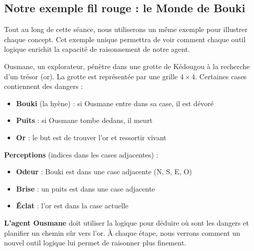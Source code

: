 \documentclass[11pt,a4paper]{article}
\begin{document}
\subsection{Notre exemple fil rouge : le Monde de Bouki}

Tout au long de cette séance, nous utiliserons un même exemple pour illustrer chaque concept. Cet exemple unique permettra de voir comment chaque outil logique enrichit la capacité de raisonnement de notre agent.

\begin{exemplebox}
Ousmane, un explorateur, pénètre dans une grotte de Kédougou à la recherche d'un trésor (or). La grotte est représentée par une grille $4 \times 4$. Certaines cases contiennent des dangers :
\begin{itemize}[nosep]
    \item \textbf{Bouki} (la hyène) : si Ousmane entre dans sa case, il est dévoré
    \item \textbf{Puits} : si Ousmane tombe dedans, il meurt
    \item \textbf{Or} : le but est de trouver l'or et ressortir vivant
\end{itemize}

\textbf{Perceptions} (indices dans les cases adjacentes) :
\begin{itemize}[nosep]
    \item \textbf{Odeur} : Bouki est dans une case adjacente (N, S, E, O)
    \item \textbf{Brise} : un puits est dans une case adjacente
    \item \textbf{Éclat} : l'or est dans la case actuelle
\end{itemize}

\textbf{L'agent Ousmane} doit utiliser la logique pour déduire où sont les dangers et planifier un chemin sûr vers l'or. À chaque étape, nous verrons comment un nouvel outil logique lui permet de raisonner plus finement.
\end{exemplebox}
\end{document}
